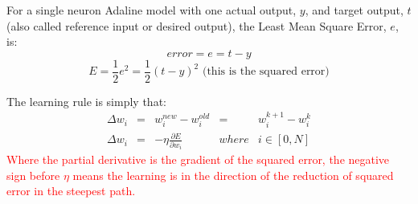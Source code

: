 \begin{definition}
For a single neuron Adaline model with one actual output, $y$, and target output, $t$ (also called reference input or desired output), the Least Mean Square Error, $e$, is:
\[error = e = t-y\]
\[E = \frac{1}{2}e^2 =\frac{1}{2} (t-y)^2 \text{    (this is the squared error)}\]
\end{definition}
The learning rule is simply that:
\[\begin{array}{*{20}{c}}
{\Delta {w_i}}& = &{w_i^{new} - w_i^{old}}& = &{w_i^{k + 1} - w_i^k}\\
{\Delta {w_i}}& = &{ - \eta \frac{{\partial E}}{{\partial {w_i}}}}&{where}&{i \in \left[ {0,N} \right]}
\end{array}\]
\textcolor{red}{Where the partial derivative is the gradient of the squared error, the negative sign before $\eta$ means the learning is in the direction of the reduction of squared error in the steepest path.}